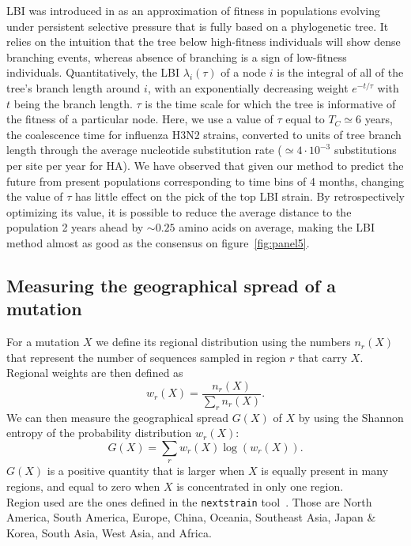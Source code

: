 \documentclass{article}
\begin{document}
	LBI was introduced in \cite{neher_predicting_2014} as an approximation of fitness in populations evolving under persistent selective pressure that is fully based on a phylogenetic tree. It relies on the intuition that the tree below high-fitness individuals will show dense branching events, whereas absence of branching is a sign of low-fitness individuals. Quantitatively, the LBI $\lambda_i(\tau)$ of a node $i$ is the integral of all of the tree's branch length around $i$, with an exponentially decreasing weight $e^{-t/\tau}$ with $t$ being the branch length. $\tau$ is the time scale for which the tree is informative of the fitness of a particular node. Here, we use a value of $\tau$ equal to $T_C\simeq6$ years, the coalescence time for influenza H3N2 strains, converted to units of tree branch length through the average nucleotide substitution rate ($\simeq 4\cdot 10^{-3}$ substitutions per site per year for HA). We have observed that given our method to predict the future from present populations corresponding to time bins of 4 months, changing the value of $\tau$ has little effect on the pick of the top LBI strain. By retrospectively optimizing its value, it is possible to reduce the average distance to the population 2 years ahead by $\sim0.25$ amino acids on average, making the LBI method almost as good as the consensus on figure~\ref{fig:panel5}. 


\subsection*{Measuring the geographical spread of a mutation} %
\label{sub:measuring_the_geographical_spread_of_a_mutation}
	For a mutation $X$ we define its regional distribution using the numbers $n_r(X)$ that represent the number of sequences sampled in region $r$ that carry $X$. Regional weights are then defined as 
	$$ w_r(X) = \frac{n_r(X)}{\sum_{r}n_r(X)}.$$
	We can then measure the geographical spread $G(X)$ of $X$ by using the Shannon entropy of the probability distribution $w_r(X)$: 
	$$G(X) = \sum_r w_r(X)\log(w_r(X)).$$
	$G(X)$ is a positive quantity that is larger when $X$ is equally present in many regions, and equal to zero when $X$ is concentrated in only one region.\\
	Region used are the ones defined in the \texttt{nextstrain} tool~\cite{10.1093/bioinformatics/bty407}. Those are {North America}, {South America}, {Europe}, {China}, {Oceania}, {Southeast Asia}, {Japan \& Korea}, {South Asia}, {West Asia}, and {Africa}.
\end{document}
